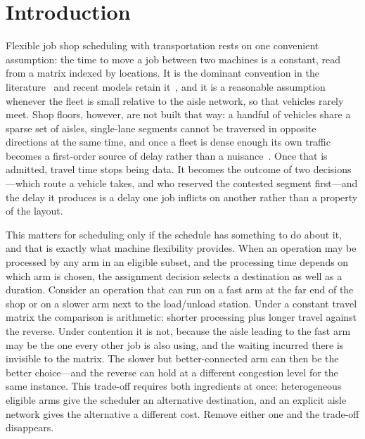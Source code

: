 \documentclass[manuscript,screen,review]{acmart}
\begin{document}

\maketitle
\section{Introduction}
\label{sec:Chapter_I}

Flexible job shop scheduling with transportation rests on one convenient
assumption: the time to move a job between two machines is a constant, read from
a matrix indexed by locations. It is the dominant convention in the
literature~\cite{xin2025review} and recent models retain
it~\cite{meng2025cp,qin2026knowledge,fu2025integrated}, and it is a reasonable
assumption whenever the fleet is small relative to the aisle network, so that
vehicles rarely meet. Shop floors, however, are not built that way: a handful of
vehicles share a sparse set of aisles, single-lane segments cannot be traversed
in opposite directions at the same time, and once a fleet is dense enough its own
traffic becomes a first-order source of delay rather than a
nuisance~\cite{kim2026congestion}. Once that is admitted, travel time stops
being data. It becomes the outcome of two decisions---which route a vehicle
takes, and who reserved the contested segment first---and the delay it produces
is a delay one job inflicts on another rather than a property of the layout.

This matters for scheduling only if the schedule has something to do about it,
and that is exactly what machine flexibility provides. When an operation may be
processed by any arm in an eligible subset, and the processing time depends on
which arm is chosen, the assignment decision selects a destination as well as a
duration. Consider an operation that can run on a fast arm at the far end of the
shop or on a slower arm next to the load/unload station. Under a constant travel
matrix the comparison is arithmetic: shorter processing plus longer travel
against the reverse. Under contention it is not, because the aisle leading to
the fast arm may be the one every other job is also using, and the waiting
incurred there is invisible to the matrix. The slower but better-connected arm
can then be the better choice---and the reverse can hold at a different
congestion level for the same instance. This trade-off requires both ingredients
at once: heterogeneous eligible arms give the scheduler an alternative
destination, and an explicit aisle network gives the alternative a different
cost. Remove either one and the trade-off disappears.
\end{document}
